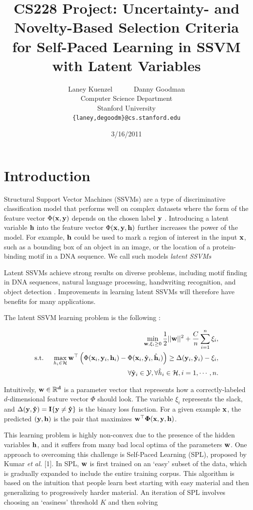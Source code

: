 \documentclass{article}
\title{CS228 Project: Uncertainty- and Novelty-Based Selection Criteria for Self-Paced Learning in SSVM with Latent Variables}
\date{3/16/2011}
\author{
Laney Kuenzel ~~~~~ Danny Goodman\\
Computer Science Department \\
Stanford University \\
\texttt{\{laney,degoodm\}@cs.stanford.edu}
}
\newcommand{\mysection}[1]{\vspace{-4mm}\section{#1}\vspace{-4mm}}
\begin{document}
\maketitle
\vspace{-8mm}

\mysection{Introduction}
\label{sec:introduction}
Structural Support Vector Machines (SSVMs) are a type of discriminative classification model that performs well on complex datasets where the form of the feature vector $\Phi(\bf x, \bf y)$ depends on the chosen label $\bf y$ \cite{SSVM}.  Introducing a latent variable $\bf h$ into the feature vector $\Phi(\bf x, \bf y, \bf h)$ further increases the power of the model.  For example, $\bf h$ could be used to mark a region of interest in the input $\bf x$, such as a bounding box of an object in an image, or the location of a protein-binding motif in a DNA sequence.  We call such models \emph{latent SSVMs}

Latent SSVMs achieve strong results on diverse problems, including motif finding in DNA sequences, natural language processing, handwriting recognition, and object detection \cite{SPL,App1,SSVM}.  Improvements in learning latent SSVMs will therefore have benefits for many applications.

The latent SSVM learning problem is the following \cite{SPL}:

\begin{eqnarray}
&&\min_{{\bf w},\xi_i \geq 0} \frac{1}{2}||{\bf w}||^2 + \frac{C}{n} \sum_{i=1}^n \xi_i, \nonumber \\
\mbox{s.t. } && \max_{h_i \in {\cal H}} {\bf w}^\top \left(\Phi({\bf x}_i,{\bf y}_i,{\bf h}_i) - 
		\Phi({\bf x}_i,\hat{\bf y}_i,\hat{\bf h}_i) \right)
	 \geq \Delta({\bf y}_i,\hat{\bf y}_i) - \xi_i, \nonumber \\
\label{eq:latentSSVM}
&&\forall \hat{\bf y}_i \in {\cal Y}, \forall \hat{h}_i \in {\cal H}, i=1,\cdots,n.
\end{eqnarray}

Intuitively, $\bf w\in\mathbb{R}^d$ is a parameter vector that represents how a correctly-labeled $d$-dimensional feature vector $\Phi$ should look.  The variable $\xi_i$ represents the slack, and $\Delta(\bf y,\hat{\bf y})=I\{\bf y\neq \hat{\bf y}\}$ is the binary loss function.
For a given example $\bf x$, the predicted $(\bf y,\bf h)$ is the pair that maximizes $\bf{{w}} ^\top \Phi(\bf x,\bf y,\bf h)$.  

This learning problem is highly non-convex due to the presence of the hidden variables $\bf h$, and it suffers from many bad local optima of the parameters $\bf w$.  One approach to overcoming this challenge is Self-Paced Learning (SPL), proposed by Kumar \textit{et al.} [1]. In SPL, $\bf w$ is first trained on an `easy' subset of the data, which is gradually expanded to include the entire training corpus.  This algorithm is based on the intuition that people learn best starting with easy material and then generalizing to progressively harder material.  An iteration of SPL involves choosing an `easiness' threshold $K$ and then solving
\end{document}
